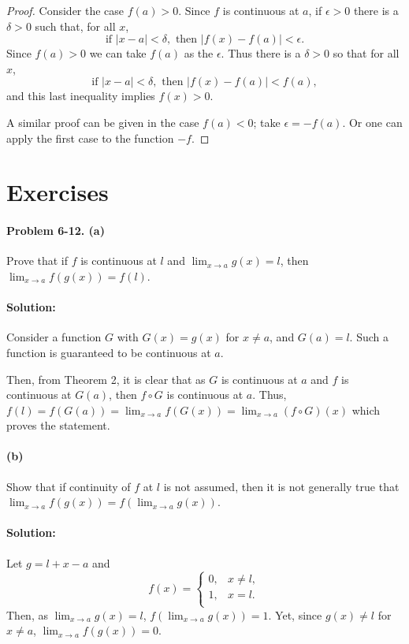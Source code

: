\documentclass{article}
\begin{document}
\begin{proof}
  Consider the case $f(a) > 0$. Since $f$ is continuous at $a$, if $\epsilon >
  0$ there is a $\delta > 0$ such that, for all $x$, \begin{equation*}
    \text{if } |x - a| < \delta, \text{ then } |f(x) - f(a)| < \epsilon.
  \end{equation*}
  Since $f(a) > 0$ we can take $f(a)$ as the $\epsilon$. Thus there is a
  $\delta > 0$ so that for all $x$, \begin{equation*}
    \text{if } |x - a| < \delta, \text{ then } |f(x) - f(a)| < f(a),
  \end{equation*}
  and this last inequality implies $f(x) > 0$.

  A similar proof can be given in the case $f(a) < 0$; take $\epsilon = -f(a)$.
  Or one can apply the first case to the function $-f$.
\end{proof}

\section*{Exercises}

\paragraph{Problem 6-12. (a)} Prove that if $f$ is continuous at $l$ and
$\lim_{x \rightarrow a}g(x) = l$, then $\lim_{x \rightarrow a}f(g(x)) = f(l)$.

\paragraph{Solution:} Consider a function $G$ with $G(x) = g(x)$ for $x
\neq a$, and $G(a) = l$. Such a function is guaranteed to be continuous at $a$.

Then, from Theorem 2, it is clear that as $G$ is continuous at $a$ and $f$ is
continuous at $G(a)$, then $f \circ G$ is continuous at $a$. Thus, $f(l) =
f(G(a)) = \lim_{x \rightarrow a}f(G(x)) = \lim_{x \rightarrow a}(f \circ G)(x)$
which proves the statement.

\paragraph{(b)} Show that if continuity of $f$ at $l$ is not assumed,
then it is not generally true that $\lim_{x \rightarrow a}f(g(x)) = f(\lim_{x
\rightarrow a}g(x))$.

\paragraph{Solution:} Let $g = l + x - a$ and \begin{equation*}
  f(x) = \begin{cases}
    0, &x \neq l, \\
    1, &x = l. \\
  \end{cases}
\end{equation*}
Then, as $\lim_{x \rightarrow a}g(x) = l$, $f(\lim_{x \rightarrow a}g(x)) = 1$.
Yet, since $g(x) \neq l$ for $x \neq a$, $\lim_{x \rightarrow a}f(g(x)) = 0$.
\end{document}
